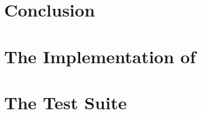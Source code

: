 \chapter{Conclusion}
\label{ch:conclusion}


\appendix

\chapter{The Implementation of \texorpdfstring{\myth{}}{Myth}}
\label{app:the-implementation-of-myth}


\chapter{The \texorpdfstring{\myth{}}{Myth} Test Suite}
\label{app:the-myth-test-suite}


